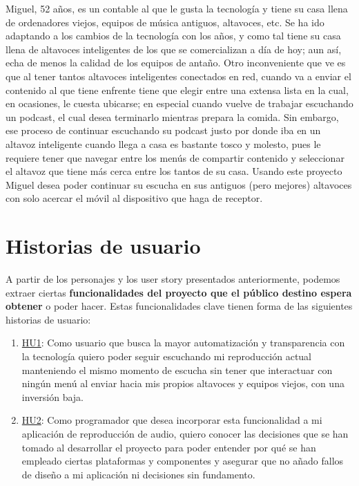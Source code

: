 Miguel, 52 años, es un contable al que le gusta la tecnología y tiene
su casa llena de ordenadores viejos, equipos de música antiguos, altavoces,
etc. Se ha ido adaptando a los cambios de la tecnología con los años, y como
tal tiene su casa llena de altavoces inteligentes de los que se
comercializan a día de hoy; aun así, echa de menos la calidad de los equipos
de antaño. Otro inconveniente que ve es que al tener tantos altavoces
inteligentes conectados en red, cuando va a enviar el contenido al que tiene
enfrente tiene que elegir entre una extensa lista en la cual, en ocasiones,
le cuesta ubicarse; en especial cuando vuelve de trabajar escuchando un
podcast, el cual desea terminarlo mientras prepara la comida. Sin embargo,
ese proceso de continuar escuchando su podcast justo por donde iba en un
altavoz inteligente cuando llega a casa es bastante tosco y molesto, pues le
requiere tener que navegar entre los menús de compartir contenido y
seleccionar el altavoz que tiene más cerca entre los tantos de su casa.
Usando este proyecto Miguel desea poder continuar su escucha en sus antiguos
(pero mejores) altavoces con solo acercar el móvil al dispositivo que haga
de receptor.



\section{Historias de usuario} \label{historias-usuario}
A partir de los personajes y los user story presentados anteriormente, podemos
extraer ciertas \textbf{funcionalidades del proyecto que el público destino espera
obtener} o poder hacer. Estas funcionalidades clave tienen forma de las
siguientes historias de usuario:

\begin{enumerate}
    \item
    \href{https://github.com/migueorg/One-touch-music-streaming-TFG-ETSIIT/issues/10}{HU1}:
    Como usuario que busca la mayor automatización y transparencia con la
    tecnología quiero poder seguir escuchando mi reproducción actual manteniendo
    el mismo momento de escucha sin tener que interactuar con ningún menú al
    enviar hacia mis propios altavoces y equipos viejos, con una inversión baja.
    \item
    \href{https://github.com/migueorg/One-touch-music-streaming-TFG-ETSIIT/issues/14}{HU2}:
    Como programador que desea incorporar esta funcionalidad a mi aplicación de
    reproducción de audio, quiero conocer las decisiones que se han tomado al
    desarrollar el proyecto para poder entender por qué se han empleado ciertas
    plataformas y componentes y asegurar que no añado fallos de diseño a mi
    aplicación ni decisiones sin fundamento.
\end{enumerate}


